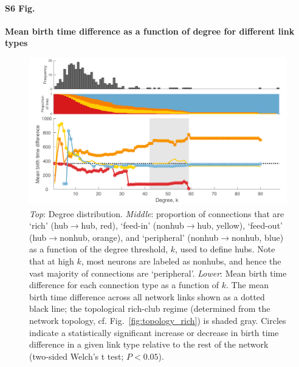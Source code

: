 \documentclass[10pt,letterpaper]{article}
\begin{document}
\paragraph*{S6 Fig.}
{\bf Mean birth time difference as a function of degree for different link types}
\begin{figure}[!h]
\label{S6_Fig}
\centering
    \includegraphics[width=1\textwidth]{MeanBirthTimes.pdf}
    \caption{\emph{Top}: Degree distribution.
\emph{Middle}: proportion of connections that are `rich' (hub$\rightarrow$hub, red), `feed-in' (nonhub$\rightarrow$hub, yellow), `feed-out' (hub$\rightarrow$nonhub, orange), and `peripheral' (nonhub$\rightarrow$nonhub, blue) as a function of the degree threshold, $k$, used to define hubs.
Note that at high $k$, most neurons are labeled as nonhubs, and hence the vast majority of connections are `peripheral'.
\emph{Lower}: Mean birth time difference for each connection type as a function of $k$.
The mean birth time difference across all network links shown as a dotted black line; the topological rich-club regime (determined from the network topology, cf. Fig.~\ref{fig:topology_rich}) is shaded gray.
Circles indicate a statistically significant increase or decrease in birth time difference in a given link type relative to the rest of the network (two-sided Welch’s t test; $P < 0.05$).
}
\end{figure}

\end{document}
